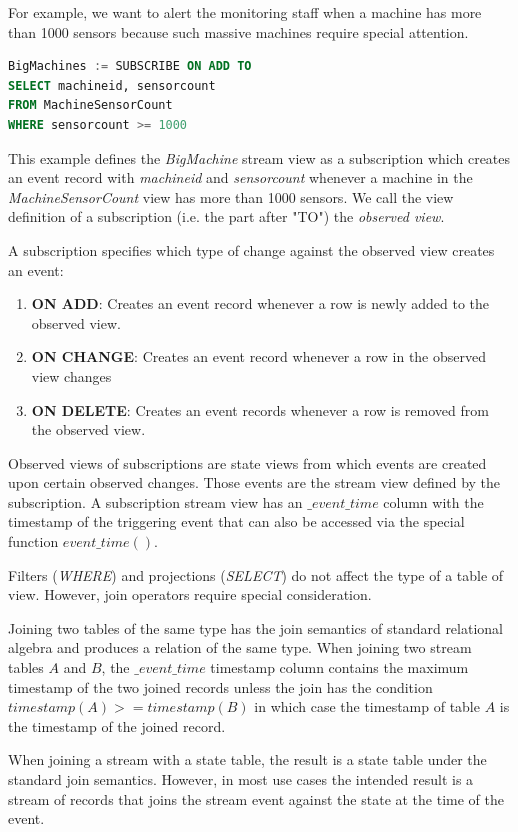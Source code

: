 \documentclass[	DIV=calc,%
							paper=letter,%
							fontsize=11pt,%
							twocolumn]{scrartcl}	 					%
\begin{document}
For example, we want to alert the monitoring staff when a machine has more than 1000 sensors because such massive machines require special attention.

\begin{lstlisting}[language=SQL]
BigMachines := SUBSCRIBE ON ADD TO
SELECT machineid, sensorcount
FROM MachineSensorCount
WHERE sensorcount >= 1000
\end{lstlisting}

This example defines the \emph{BigMachine} stream view as a subscription which creates an event record with \emph{machineid} and \emph{sensorcount} whenever a machine in the \emph{MachineSensorCount} view has more than 1000 sensors. We call the view definition of a subscription (i.e. the part after "TO") the \emph{observed view}.

A subscription specifies which type of change against the observed view creates an event:
\begin{enumerate}
    \item \textbf{ON ADD}: Creates an event record whenever a row is newly added to the observed view.
    \item \textbf{ON CHANGE}: Creates an event record whenever a row in the observed view changes
    \item \textbf{ON DELETE}: Creates an event records whenever a row is removed from the observed view.
\end{enumerate}

Observed views of subscriptions are state views from which events are created upon certain observed changes. Those events are the stream view defined by the subscription. A subscription stream view has an $\_event\_time$ column with the timestamp of the triggering event that can also be accessed via the special function $event\_time()$.

Filters (\emph{WHERE}) and projections (\emph{SELECT}) do not affect the type of a table of view. However, join operators require special consideration.

Joining two tables of the same type has the join semantics of standard relational algebra and produces a relation of the same type. When joining two stream tables $A$ and $B$, the $\_event\_time$ timestamp column contains the maximum timestamp of the two joined records unless the join has the condition $timestamp(A) >= timestamp(B)$ in which case the timestamp of table $A$ is the timestamp of the joined record.

When joining a stream with a state table, the result is a state table under the standard join semantics. However, in most use cases the intended result is a stream of records that joins the stream event against the state at the time of the event.
\end{document}
